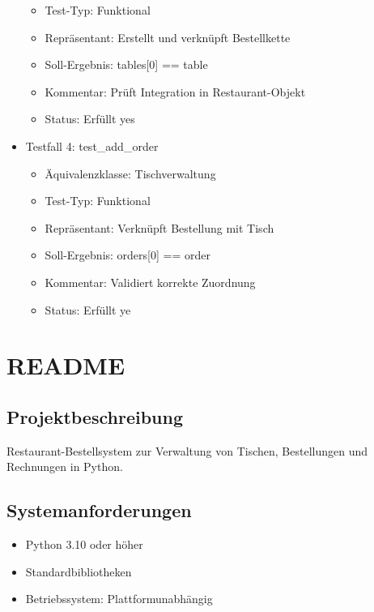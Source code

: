 \documentclass[a4paper,11pt]{article}
\begin{document}
\begin{itemize}
\begin{itemize}
        \item Test-Typ: Funktional
        \item Repräsentant: Erstellt und verknüpft Bestellkette
        \item Soll-Ergebnis: tables[0] == table
        \item Kommentar: Prüft Integration in Restaurant-Objekt
        \item Status: Erfüllt yes
    \end{itemize}
  \item Testfall 4: test\_add\_order
    \begin{itemize}
        \item Äquivalenzklasse: Tischverwaltung
        \item Test-Typ: Funktional
        \item Repräsentant: Verknüpft Bestellung mit Tisch
        \item Soll-Ergebnis: orders[0] == order
        \item Kommentar: Validiert korrekte Zuordnung
        \item Status: Erfüllt ye
    \end{itemize}
\end{itemize}




\section{README}
\subsection{Projektbeschreibung}
Restaurant-Bestellsystem zur Verwaltung von Tischen, Bestellungen und Rechnungen in Python.

\subsection{Systemanforderungen}
\begin{itemize}
    \item Python 3.10 oder höher
    \item Standardbibliotheken
    \item Betriebssystem: Plattformunabhängig
\end{itemize}
\end{document}
